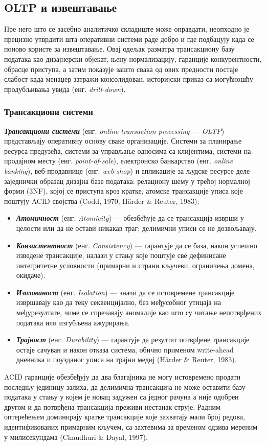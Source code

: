 \subsection{OLTP и извештавање}
Пре него што се засебно аналитичко складиште може оправдати, неопходно је прецизно утврдити шта оперативни системи раде добро и где подбацују када се поново користе за извештавање. Овај одељак разматра трансакциону базу података као дизајнерски објекат, њену нормализацију, гаранције конкурентности, обрасце приступа, а затим показује зашто свака од ових предности постаје слабост када менаџер затражи консолидован, историјски приказ са могућношћу продубљивања увида (енг. \textit{drill-down}).

\subsubsection{Трансакциони системи}
\textbf{\textit{Трансакциони системи}} (енг. \textit{online transaction processing — OLTP}) представљају оперативну основу сваке организације. Системи за планирање ресурса предузећа, системи за управљање односима са клијентима, системи на продајном месту (енг. \textit{point-of-sale}), електронско банкарство (енг. \textit{online banking}), веб-продавнице (енг. \textit{web-shop}) и апликације за људске ресурсе деле заједнички образац дизајна базе података: релациону шему у трећој нормалној форми (3NF), којој се приступа кроз кратке, атомске трансакције уписа које поштују ACID својства (Codd, 1970; Härder \& Reuter, 1983):

\begin{itemize}
  \item \textbf{\textit{Атомичност}} (енг. \textit{Atomicity}) — обезбеђује да се трансакција изврши у целости или да не остави никакав траг; делимични уписи се не дозвољавају.
  \item \textbf{\textit{Конзистентност}} (енг. \textit{Consistency}) — гарантује да се база, након успешно изведене трансакције, налази у стању које поштује све дефинисане интегритетне условности (примарни и страни кључеви, ограничења домена, окидаче).
  \item \textbf{\textit{Изолованост}} (енг. \textit{Isolation}) — значи да се истовремене трансакције извршавају као да теку секвенцијално, без међусобног утицаја на међурезултате, чиме се спречавају аномалије као што су читање непотврђених података или изгубљена ажурирања.
  \item \textbf{\textit{Трајност}} (енг. \textit{Durability}) — гарантује да резултат потврђене трансакције остаје сачуван и након отказа система, обично применом write-ahead дневника и поузданог уписа на трајни медиј (Härder \& Reuter, 1983).
\end{itemize}
ACID гаранције обезбеђују да два благајника не могу истовремено продати последњу јединицу залиха, да делимична трансакција не може оставити базу података у стању у којем је новац задужен са једног рачуна а није одобрен другом и да потврђена трансакција преживи нестанак струје. Радним оптерећењем доминирају кратке трансакције које захватају мали број редова, идентификованих примарним кључем, са захтевима за временом одзива мереним у милисекундама (Chaudhuri \& Dayal, 1997).


